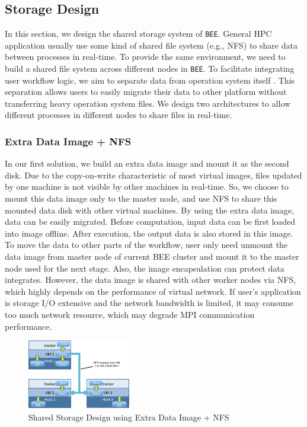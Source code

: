 \subsection{Storage Design}
In this section, we design the shared storage system of \texttt{BEE}. General HPC application usually use some kind of shared file system (e.g., NFS) to share data between processes in real-time. To provide the same environment, we need to build a shared file system across different nodes in \texttt{BEE}. To facilitate integrating user workflow logic, we aim to separate data from operation system itself . This separation allows users to easily migrate their data to other platform without transferring heavy operation system files. We design two architectures to allow different processes in different nodes to share files in real-time.

\subsubsection{Extra Data Image + NFS}
In our first solution, we build an extra data image and mount it as the second disk. Due to the copy-on-write characteristic of most virtual images, files updated by one machine is not visible by other machines in real-time. So, we choose to mount this data image only to the master node, and use NFS to share this mounted data disk with other virtual machines. By using the extra data image, data can be easily migrated.  Before computation, input data can be first loaded into image offline. After execution, the output data is also stored in this image. To move the data to other parts of the workflow, user only need unmount the data image from master node of current BEE cluster and mount it to the master node used for the next stage. Also, the image encapsulation can protect data integrates. However, the data image is shared with other worker nodes via NFS, which highly depends on the performance of virtual network. If user's application is storage I/O extensive and the network bandwidth is limited, it may consume too much network resource, which may degrade MPI communication performance.
\begin{figure}[h]
    \centering
    \caption{Shared Storage Design using Extra Data Image + NFS}
    \label{fs1}
    \includegraphics[width=0.4\textwidth]{figures/fs1.pdf}
\end{figure}

